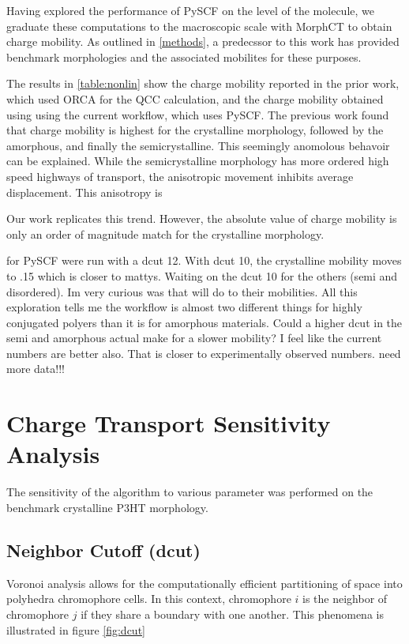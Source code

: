 Having explored the performance of PySCF on the level of the molecule, we graduate these computations to the
macroscopic scale with MorphCT to obtain charge mobility. As outlined in \autoref{methods}, a predecssor to
this work has provided benchmark morphologies and the associated mobilites for these purposes. 

The results in \ref{table:nonlin} show the charge mobility reported in the prior work, which used ORCA for
the QCC calculation, and the charge mobility obtained using using the current workflow, which uses PySCF. 
The previous work found that charge mobility is highest for the crystalline morphology, followed by the
amorphous, and finally the semicrystalline. This seemingly anomolous behavoir can be explained. While the
semicrystalline morphology has more ordered high speed highways of transport, the anisotropic movement
inhibits average displacement. This anisotropy is

Our work replicates this trend. However, the absolute value of charge mobility is only an order of magnitude
match for the crystalline morphology. 

for PySCF were run with a dcut 12. With dcut 10, the crystalline mobility
moves to .15 which is closer to mattys. Waiting on the dcut 10 for the others (semi and disordered). Im very
curious was that will do to their mobilities. All this exploration tells me the workflow is almost two
different things for highly conjugated polyers than it is for amorphous materials. Could a higher dcut in the
semi and amorphous actual make for a slower mobility? I feel like the current numbers are better also. That is
closer to experimentally observed numbers. need more data!!!


\section{Charge Transport Sensitivity Analysis}

The sensitivity of the algorithm to various parameter was performed on the benchmark crystalline P3HT
morphology.

\subsection{Neighbor Cutoff (dcut)}
\label{dcutresults}
Voronoi analysis allows for the computationally efficient partitioning of space into
polyhedra chromophore cells. In this context, chromophore $i$ is the neighbor of chromophore $j$ if they
share a boundary with one another.  
This phenomena is illustrated in figure \ref{fig:dcut} 

